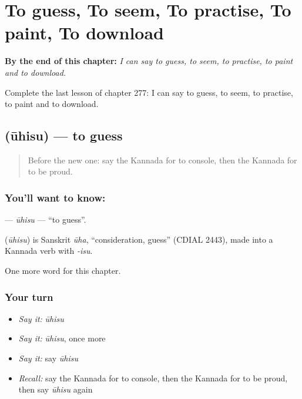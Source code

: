 
\chapter{To guess, To seem, To practise, To paint, To download}
\label{ch:ka-to-guess-to-seem-to-practise-to-paint-to-download}

\begin{chapteropening}
\textbf{By the end of this chapter:} \emph{I can say to guess, to seem, to practise, to paint and to download.}

Complete the last lesson of chapter 277: I can say to guess, to seem, to practise, to paint and to download.
\end{chapteropening}

\section[\texorpdfstring{\kn{ಊಹಿಸು} (ūhisu)}{ಊಹಿಸು (ūhisu)}]{ (ūhisu) — to guess}

\label{lesson:KA-C277-uhisu}



\begin{quote}
Before the new one: say the Kannada for to console, then the Kannada for to be proud.
\end{quote}

\subsection*{You'll want to know: }
\textbf{} — \emph{ūhisu} — \textquotedblleft{}to guess\textquotedblright{}.

\begin{cousinweb}
\textbf{} (\emph{ūhisu}) is Sanskrit \emph{ūha}, \textquotedblleft{}consideration, guess\textquotedblright{} (CDIAL 2443), made into a Kannada verb with \emph{-isu}.
\end{cousinweb}

\begin{grammarlens}[title={What you've built}]
One more word for this chapter.
\end{grammarlens}

\subsection*{Your turn}
\begin{itemize}
\raggedright
  \item \emph{Say it:} \emph{ūhisu}
  \item \emph{Say it:} \emph{ūhisu}, once more
  \item \emph{Say it:} say \emph{ūhisu}
  \item \emph{Recall:} say the Kannada for to console, then the Kannada for to be proud, then say \emph{ūhisu} again
\end{itemize}

